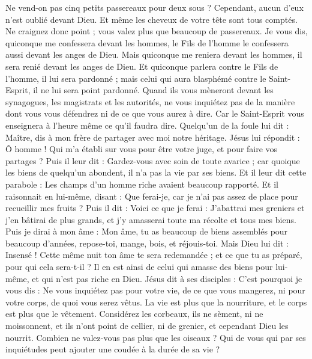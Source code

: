 \begin{multicols}{2}
Ne vend-on pas cinq petits passereaux pour deux sous ? Cependant, aucun d’eux n'est oublié devant Dieu.
Et même les cheveux de votre tête sont tous comptés. Ne craignez donc point ; vous valez plus que beaucoup de passereaux.
Je vous dis, quiconque me confessera devant les hommes, le Fils de l'homme le confessera aussi devant les anges de Dieu.
Mais quiconque me reniera devant les hommes, il sera renié devant les anges de Dieu.
Et quiconque parlera contre le Fils de l'homme, il lui sera pardonné ; mais celui qui aura blasphémé contre le Saint-Esprit, il ne lui sera point pardonné.
Quand ils vous mèneront devant les synagogues, les magistrats et les autorités, ne vous inquiétez pas de la manière dont vous vous défendrez ni de ce que vous aurez à dire.
Car le Saint-Esprit vous enseignera à l’heure même ce qu'il faudra dire.
Quelqu'un de la foule lui dit : Maître, dis à mon frère de partager avec moi notre héritage.
Jésus lui répondit : Ô homme ! Qui m'a établi sur vous pour être votre juge, et pour faire vos partages ?
Puis il leur dit : Gardez-vous avec soin de toute avarice ; car quoique les biens de quelqu’un abondent, il n’a pas la vie par ses biens.
Et il leur dit cette parabole : Les champs d'un homme riche avaient beaucoup rapporté.
Et il raisonnait en lui-même, disant : Que ferai-je, car je n'ai pas assez de place pour recueillir mes fruits ?
Puis il dit : Voici ce que je ferai : J'abattrai mes greniers et j'en bâtirai de plus grands, et j'y amasserai toute ma récolte et tous mes biens.
Puis je dirai à mon âme : Mon âme, tu as beaucoup de biens assemblés pour beaucoup d'années, repose-toi, mange, bois, et réjouis-toi.
Mais Dieu lui dit : Insensé ! Cette même nuit ton âme te sera redemandée ; et ce que tu as préparé, pour qui cela sera-t-il ?
Il en est ainsi de celui qui amasse des biens pour lui-même, et qui n'est pas riche en Dieu.
Jésus dit à ses disciples : C’est pourquoi je vous dis : Ne vous inquiétez pas pour votre vie, de ce que vous mangerez, ni pour votre corps, de quoi vous serez vêtus.
La vie est plus que la nourriture, et le corps est plus que le vêtement.
Considérez les corbeaux, ils ne sèment, ni ne moissonnent, et ils n'ont point de cellier, ni de grenier, et cependant Dieu les nourrit. Combien ne valez-vous pas plus que les oiseaux ?
Qui de vous qui par ses inquiétudes peut ajouter une coudée à la durée de sa vie ?

\end{multicols}
